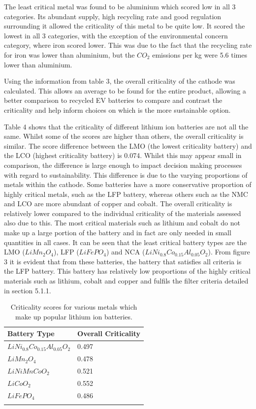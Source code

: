 \documentclass{article}
\begin{document}
The least critical metal was found to be aluminium which scored low in all 3 categories. Its abundant supply, high recycling rate and good regulation surrounding it allowed the criticality of this metal to be quite low. It scored the lowest in all 3 categories, with the exception of the environmental concern category, where iron scored lower. This was due to the fact that the recycling rate for iron was lower than aluminium, but the $CO_{2}$ emissions per kg were 5.6 times lower than aluminium. 

Using the information from table 3, the overall criticality of the cathode was calculated. This allows an average to be found for the entire product, allowing a better comparison to recycled EV batteries to compare and contrast the criticality and help inform choices on which is the more sustainable option.

Table 4 shows that the criticality of different lithium ion batteries are not all the same. Whilst some of the scores are higher than others, the overall criticality is similar. The score difference between the LMO (the lowest criticality battery) and the LCO (highest criticality battery) is 0.074. Whilst this may appear small in comparison, the difference is large enough to impact decision making processes with regard to sustainability. This difference is due to the varying proportions of metals within the cathode. Some batteries have a more conservative proportion of highly critical metals, such as the LFP battery, whereas others such as the NMC and LCO are more abundant of copper and cobalt. The overall criticality is relatively lower compared to the individual criticality of the materials assessed also due to this. The most critical materials such as lithium and cobalt do not make up a large portion of the battery and in fact are only needed in small quantities in all cases. It can be seen that the least critical battery types are the LMO ($LiMn_{2}O_{4}$), LFP ($LiFePO_{4}$) and NCA ($LiNi_{0.8}Co_{0.15}Al_{0.05}O_{2}$). From figure 3 it is evident that from these batteries, the battery that satisfies all criteria is the LFP battery. This battery has relatively low proportions of the highly critical materials such as lithium, cobalt and copper and fulfils the filter criteria detailed in section 5.1.1.

\newpage
\begin{longtable}{| p{} | p{} |}
\hline
Battery Type & Overall Criticality \\\hline

{$LiNi_{0.8}Co_{0.15}Al_{0.05}O_{2}$} &{0.497} \\\hline
{$LiMn_{2}O_{4}$} & {0.478}\\\hline
{$LiNiMnCoO_{2}$} &{0.521}\\\hline
{$LiCoO_{2}$} &{0.552}\\\hline
{$LiFePO_{4}$} &{0.486}\\\hline

\caption{Criticality scores for various metals which make up popular lithium ion batteries.}
\end{longtable}
\end{document}
